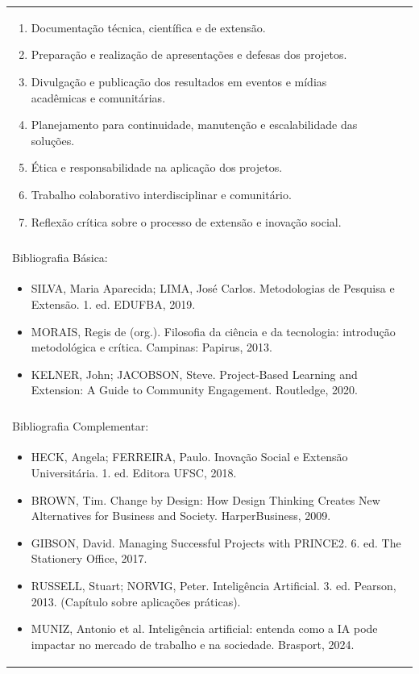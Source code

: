 \documentclass[11pt]{article}
\begin{document}
\begin{center}
\begin{longtable}{|p{4cm}|p{4cm}|p{4cm}|p{4cm}|}
{\begin{enumerate}
\item Documentação técnica, científica e de extensão.
\item Preparação e realização de apresentações e defesas dos projetos.
\item Divulgação e publicação dos resultados em eventos e mídias acadêmicas e comunitárias.
\item Planejamento para continuidade, manutenção e escalabilidade das soluções.
\item Ética e responsabilidade na aplicação dos projetos.
\item Trabalho colaborativo interdisciplinar e comunitário.
\item Reflexão crítica sobre o processo de extensão e inovação social.\end{enumerate}}\\
\multicolumn{4}{|p{16cm}|}{}\\
\hline
\multicolumn{4}{|p{16cm}|}{Bibliografia Básica:}\\
\multicolumn{4}{|p{16cm}|}{%
\begin{itemize}\item SILVA, Maria Aparecida; LIMA, José Carlos. Metodologias de Pesquisa e Extensão. 1. ed. EDUFBA, 2019.
\item MORAIS, Regis de (org.). Filosofia da ciência e da tecnologia: introdução metodológica e crítica. Campinas: Papirus, 2013.
\item KELNER, John; JACOBSON, Steve. Project-Based Learning and Extension: A Guide to Community Engagement. Routledge, 2020.\end{itemize}}\\
\multicolumn{4}{|p{16cm}|}{}\\
\hline
\multicolumn{4}{|p{16cm}|}{Bibliografia Complementar:}\\
\multicolumn{4}{|p{16cm}|}{%
\begin{itemize}\item HECK, Angela; FERREIRA, Paulo. Inovação Social e Extensão Universitária. 1. ed. Editora UFSC, 2018.
\item BROWN, Tim. Change by Design: How Design Thinking Creates New Alternatives for Business and Society. HarperBusiness, 2009.
\item GIBSON, David. Managing Successful Projects with PRINCE2. 6. ed. The Stationery Office, 2017.
\item RUSSELL, Stuart; NORVIG, Peter. Inteligência Artificial. 3. ed. Pearson, 2013. (Capítulo sobre aplicações práticas).
\item MUNIZ, Antonio et al. Inteligência artificial: entenda como a IA pode impactar no mercado de trabalho e na sociedade. Brasport, 2024.\end{itemize}}\\
\hline
\end{longtable}
\end{center}
\end{document}
